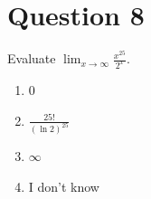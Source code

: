 
\section*{Question 8}
Evaluate $\displaystyle\lim_{x\to\infty}\frac{x^{25}}{2^x}$.
    
\begin{enumerate}[label = \alph*.]
    \item 0
    \item $\displaystyle\frac{25!}{(\ln 2)^{25}}$
    \item $\infty$
    \item I don't know
\end{enumerate}

\setcounter{solutionMainStep}{0}
\setcounter{solutionSubStep}{0}

